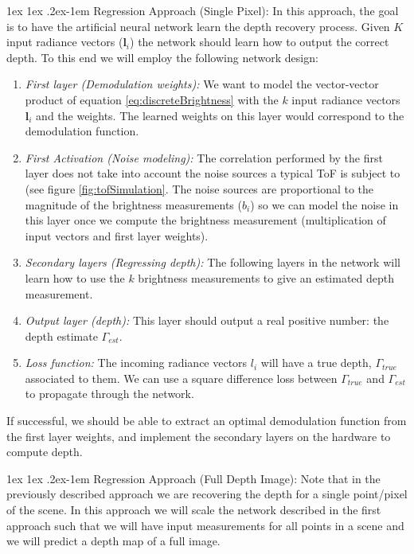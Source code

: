 \documentclass[12pt]{article}
\makeatletter
\def \l {\mathbf{l}}
\renewcommand{\paragraph}{%
  \@startsection{paragraph}{4}%
  {\z@}{1ex \@plus 1ex \@minus .2ex}{-1em}%
  {\normalfont\normalsize\bfseries}%
}
\makeatother
\begin{document}
\paragraph{Regression Approach (Single Pixel):} In this approach, the goal is to have the artificial neural network learn the depth recovery process. Given $K$ input radiance vectors ($\l_i$) the network should learn how to output the correct depth. To this end we will employ the following network design:

\begin{enumerate}
	\item \textit{First layer (Demodulation weights):} We want to model the vector-vector product of equation \ref{eq:discreteBrightness} with the $k$ input radiance vectors $\l_i$ and the weights. The learned weights on this layer would correspond to the demodulation function.
	\item \textit{First Activation (Noise modeling):} The correlation performed by the first layer does not take into account the noise sources a typical ToF is subject to (see figure \ref{fig:tofSimulation}. The noise sources are proportional to the magnitude of the brightness measurements ($b_i$) so we can model the noise in this layer once we compute the brightness measurement (multiplication of input vectors and first layer weights).
	\item \textit{Secondary layers (Regressing depth):} The following layers in the network will learn how to use the $k$ brightness measurements to give an estimated depth measurement.
	\item \textit{Output layer (depth):} This layer should output a real positive number: the depth estimate $\Gamma_{est}$.
	\item \textit{Loss function:} The incoming radiance vectors $l_i$ will have a true depth, $\Gamma_{true}$ associated to them. We can use a square difference loss between $\Gamma_{true}$ and $\Gamma_{est}$ to propagate through the network.
\end{enumerate}

If successful, we should be able to extract an optimal demodulation function from the first layer weights, and implement the secondary layers on the hardware to compute depth.

\paragraph{Regression Approach (Full Depth Image):} Note that in the previously described approach we are recovering the depth for a single point/pixel of the scene. In this approach we will scale the network described in the first approach such that we will have input measurements for all points in a scene and we will predict a depth map of a full image. 
\end{document}
